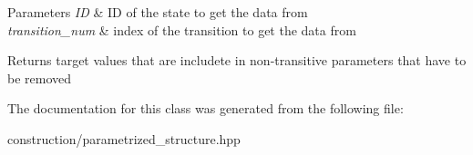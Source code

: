 \begin{DoxyParams}{\-Parameters}
{\em \-I\-D} & \-I\-D of the state to get the data from \\
\hline
{\em transition\-\_\-num} & index of the transition to get the data from\\
\hline
\end{DoxyParams}
\begin{DoxyReturn}{\-Returns}
target values that are includete in non-\/transitive parameters that have to be removed 
\end{DoxyReturn}


\-The documentation for this class was generated from the following file\-:\begin{DoxyCompactItemize}
\item 
construction/parametrized\-\_\-structure.\-hpp\end{DoxyCompactItemize}
